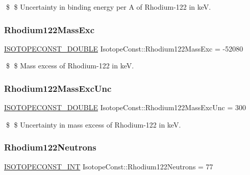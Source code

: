 \$ \$ Uncertainty in binding energy per A of Rhodium-\/122 in keV. \mbox{\label{group___isotope_const-_rhodium-_rh122_ga3e2a6d65e82b668cab75f11c152acbe8}} 
\subsubsection{\texorpdfstring{Rhodium122\+Mass\+Exc}{Rhodium122MassExc}}
{\footnotesize\ttfamily \mbox{\hyperlink{group___isotope_const-_macros_ga8f45a7272ce02c0b4c65c44636ed719a}{I\+S\+O\+T\+O\+P\+E\+C\+O\+N\+S\+T\+\_\+\+D\+O\+U\+B\+LE}} Isotope\+Const\+::\+Rhodium122\+Mass\+Exc = -\/52080}

\$ \$ Mass excess of Rhodium-\/122 in keV. \mbox{\label{group___isotope_const-_rhodium-_rh122_ga0027767f447ed829867d95f5e0539f1e}} 
\subsubsection{\texorpdfstring{Rhodium122\+Mass\+Exc\+Unc}{Rhodium122MassExcUnc}}
{\footnotesize\ttfamily \mbox{\hyperlink{group___isotope_const-_macros_ga8f45a7272ce02c0b4c65c44636ed719a}{I\+S\+O\+T\+O\+P\+E\+C\+O\+N\+S\+T\+\_\+\+D\+O\+U\+B\+LE}} Isotope\+Const\+::\+Rhodium122\+Mass\+Exc\+Unc = 300}

\$ \$ Uncertainty in mass excess of Rhodium-\/122 in keV. \mbox{\label{group___isotope_const-_rhodium-_rh122_ga57e0713ac5eec532431b609a226f7a5e}} 
\subsubsection{\texorpdfstring{Rhodium122\+Neutrons}{Rhodium122Neutrons}}
{\footnotesize\ttfamily \mbox{\hyperlink{group___isotope_const-_macros_ga5f18360b3e99483a35c32d789e62621c}{I\+S\+O\+T\+O\+P\+E\+C\+O\+N\+S\+T\+\_\+\+I\+NT}} Isotope\+Const\+::\+Rhodium122\+Neutrons = 77}

